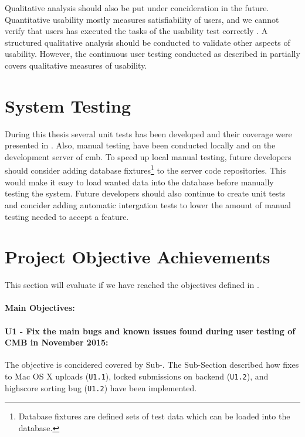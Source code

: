 Qualitative analysis should also be put under concideration in the future. Quantitative usability mostly measures satisfiability of users, and we cannot verify that users has executed the tasks of the usability test correctly \cite{holzinger2005}. A structured qualitative analysis should be conducted to validate other aspects of usability. However, the continuous user testing conducted as described in  partially covers qualitative measures of usability.

\section{System Testing}
\label{sec:eval-sys-testing}
During this thesis several unit tests has been developed and their coverage were presented in . Also, manual testing have been conducted locally and on the development server of \gls{cmb}. To speed up local manual testing, future developers should consider adding database fixtures\footnote{Database fixtures are defined sets of test data which can be loaded into the database.} to the server code repositories. This would make it easy to load wanted data into the database before manually testing the system. Future developers should also continue to create unit tests and concider adding automatic intergation tests to lower the amount of manual testing needed to accept a feature.

\section{Project Objective Achievements}
\label{sec:eval-pr-achiev}
This section will evaluate if we have reached the objectives defined in .

\paragraph*{Main Objectives:} \hfill

\paragraph*{U1 - Fix the main bugs and known issues found during user testing of CMB in November 2015:} The objective is concidered covered by Sub-. The Sub-Section described how fixes to Mac OS X uploads (\texttt{U1.1}), locked submissions on backend (\texttt{U1.2}), and highscore sorting bug (\texttt{U1.2}) have been implemented.


